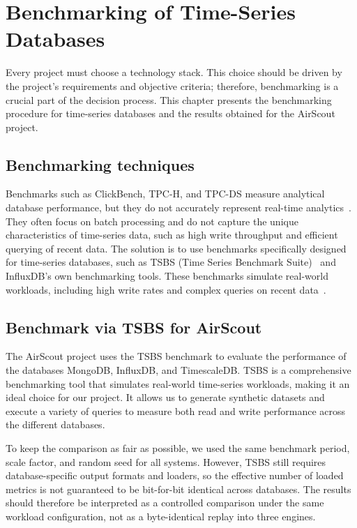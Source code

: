 \chapter{Benchmarking of Time-Series Databases}\label{sec:benchmarking}

Every project must choose a technology stack. This choice should be driven by
the project's requirements and objective criteria; therefore, benchmarking is a
crucial part of the decision process. This chapter presents the benchmarking
procedure for time-series databases and the results obtained for the AirScout
project.

\section{Benchmarking techniques}

Benchmarks such as ClickBench, TPC-H, and TPC-DS measure analytical database
performance, but they do not accurately represent real-time
analytics~\cite{Benchmarking:03}. They often focus on batch processing and do
not capture the unique characteristics of time-series data, such as high write
throughput and efficient querying of recent data. The solution is to use
benchmarks specifically designed for time-series databases, such as TSBS (Time
Series Benchmark Suite)~\cite{TSBS:01} and InfluxDB's own benchmarking tools.
These benchmarks simulate real-world workloads, including high write rates and
complex queries on recent data~\cite{QuestDB:01}.

\section{Benchmark via TSBS for AirScout}

The AirScout project uses the TSBS benchmark to evaluate the performance of the
databases MongoDB, InfluxDB, and TimescaleDB\@. TSBS is a comprehensive
benchmarking tool that simulates real-world time-series workloads, making it an
ideal choice for our project. It allows us to generate synthetic datasets and
execute a variety of queries to measure both read and write performance across
the different databases.

To keep the comparison as fair as possible, we used the same benchmark period,
scale factor, and random seed for all systems. However, TSBS still requires
database-specific output formats and loaders, so the effective number of loaded
metrics is not guaranteed to be bit-for-bit identical across databases. The
results should therefore be interpreted as a controlled comparison under the
same workload configuration, not as a byte-identical replay into three engines.

